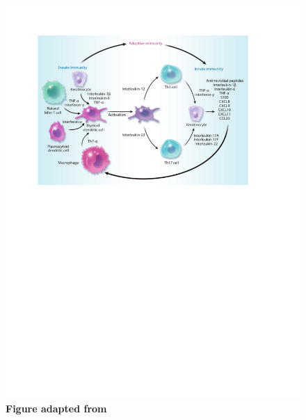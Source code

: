 \begin{figure}[H]
\includegraphics[width=\textwidth]{./Introduction/pdfs/PSO_adaptive_innate_immune_system_crosstalk.pdf}
\caption[Crosstalk between innate and adaptive immunity in psoriasis]{\textbf{Figure adapted from \parencite{Nestle2009}}}
\label{fig:PSO_immune_system_diagram}
\end{figure}

